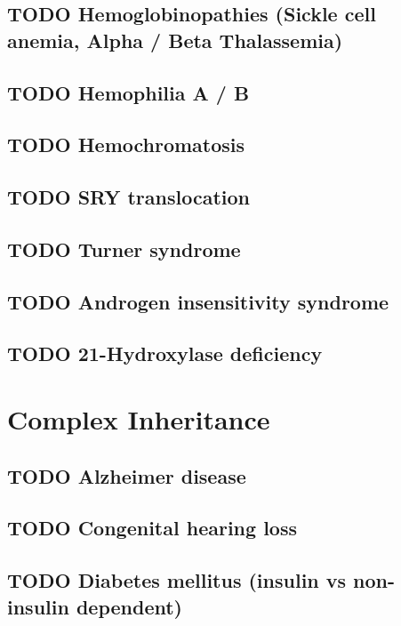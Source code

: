 \documentclass{scrartcl}
\begin{document}
\subsection{{\bfseries\sffamily TODO} Hemoglobinopathies (Sickle cell anemia, Alpha / Beta Thalassemia)}
\label{sec:orgcec5306}
\subsection{{\bfseries\sffamily TODO} Hemophilia A / B}
\label{sec:org75a6a73}
\subsection{{\bfseries\sffamily TODO} Hemochromatosis}
\label{sec:org34cffc3}
\subsection{{\bfseries\sffamily TODO} SRY translocation}
\label{sec:org25a0bad}
\subsection{{\bfseries\sffamily TODO} Turner syndrome}
\label{sec:org5f98ee1}
\subsection{{\bfseries\sffamily TODO} Androgen insensitivity syndrome}
\label{sec:orgf537bc5}
\subsection{{\bfseries\sffamily TODO} 21-Hydroxylase deficiency}
\label{sec:orgd8edbf1}

\section{Complex Inheritance}
\label{sec:org5aecdad}
\subsection{{\bfseries\sffamily TODO} Alzheimer disease}
\label{sec:org54416f0}
\subsection{{\bfseries\sffamily TODO} Congenital hearing loss}
\label{sec:orgfacdd68}
\subsection{{\bfseries\sffamily TODO} Diabetes mellitus (insulin vs non-insulin dependent)}
\label{sec:orgf6531f9}
\end{document}
